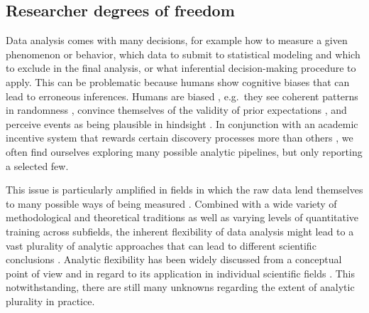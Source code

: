 \documentclass[Review,times,sageh]{sagej}
\begin{document}
\hypertarget{researcher-degrees-of-freedom}{%
\subsection{Researcher degrees of freedom}\label{researcher-degrees-of-freedom}}

Data analysis comes with many decisions, for example how to measure a given phenomenon or behavior, which data to submit to statistical modeling and which to exclude in the final analysis, or what inferential decision-making procedure to apply.
This can be problematic because humans show cognitive biases that can lead to erroneous inferences.
Humans are biased \citep[e.g.,][]{tversky1974judgment}, e.g.~they see coherent patterns in randomness \citep{brugger2001}, convince themselves of the validity of prior expectations \citep[``I knew it'',][]{nickerson1998confirmation}, and perceive events as being plausible in hindsight \citep[``I knew it all along'',][]{fischhoff1975hindsight}.
In conjunction with an academic incentive system that rewards certain discovery processes more than others \citep{sterling1959publication, koole2012rewarding}, we often find ourselves exploring many possible analytic pipelines, but only reporting a selected few.

This issue is particularly amplified in fields in which the raw data lend themselves to many possible ways of being measured \citep{roettger2019researcher}.
Combined with a wide variety of methodological and theoretical traditions as well as varying levels of quantitative training across subfields, the inherent flexibility of data analysis might lead to a vast plurality of analytic approaches that can lead to different scientific conclusions \citep{roettger2019emergent}.
Analytic flexibility has been widely discussed from a conceptual point of view \citep{simmons2011false, wagenmakers2012agenda, nosek2014method} and in regard to its application in individual scientific fields \citep[e.g.][]{wicherts2016, charles2019, roettger2019researcher}.
This notwithstanding, there are still many unknowns regarding the extent of analytic plurality in practice.
\end{document}
